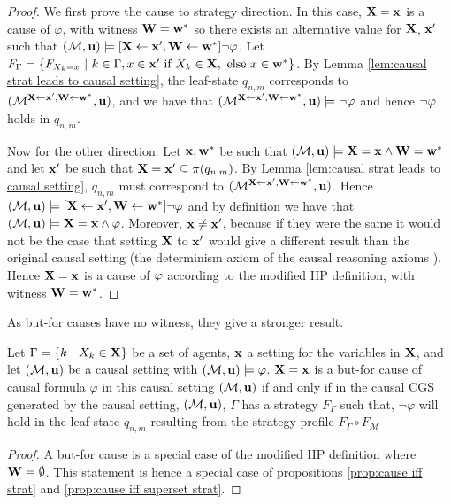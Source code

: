 \begin{proof}
    We first prove the cause to strategy direction.
    In this case, $\mathbf{X} = \mathbf{x}$ is a cause of $\varphi$, with witness $\mathbf{W} = \mathbf{w}^*$ so there exists an alternative value for $\mathbf{X}$, $\mathbf{x}'$ such that $(\mathcal{M},\mathbf{u}) \models [\mathbf{X} \leftarrow \mathbf{x}', \mathbf{W} \leftarrow \mathbf{w}^*] \neg \varphi$.
    Let $F_\Gamma = \{F_{X_k = x} \ | \ k \in \Gamma, x \in \mathbf{x}' \text{ if } X_k \in \mathbf{X}, \text{ else } x \in \mathbf{w}^*\}$. 
    By Lemma \ref{lem:causal strat leads to causal setting}, the leaf-state $q_{n,m}$ corresponds to $(\mathcal{M}^{\mathbf{X} \leftarrow \mathbf{x}',\mathbf{W}\leftarrow \mathbf{w}^*},\mathbf{u})$, and we have that $(\mathcal{M}^{\mathbf{X} \leftarrow \mathbf{x}', \mathbf{W}\leftarrow\mathbf{w}^*},\mathbf{u})\models\neg \varphi$ and hence $\neg \varphi$ holds in $q_{n,m}$.
    
    Now for the other direction. 
    Let $\mathbf{x}, \mathbf{w}^*$ be such that $(\mathcal{M},\mathbf{u}) \models \mathbf{X} = \mathbf{x} \wedge \mathbf{W} = \mathbf{w}^*$ and let $\mathbf{x}'$ be such that $\mathbf{X} = \mathbf{x}'\subseteq \pi(q_{n,m})$. 
    By Lemma \ref{lem:causal strat leads to causal setting}, $q_{n,m}$ must correspond to $(\mathcal{M}^{\mathbf{X}\leftarrow\mathbf{x}', \mathbf{W} \leftarrow \mathbf{w}^*},\mathbf{u})$. 
    Hence $(\mathcal{M},\mathbf{u}) \models [\mathbf{X} \leftarrow \mathbf{x}', \mathbf{W} \leftarrow \mathbf{w}^*]\neg \varphi$ and by definition we have that $(\mathcal{M},\mathbf{u}) \models \mathbf{X} = \mathbf{x} \wedge \varphi$. 
    Moreover, $\mathbf{x} \neq \mathbf{x}'$, because if they were the same it would not be the case that setting $\mathbf{X}$ to $\mathbf{x}'$ would give a different result than the original causal setting (the determinism axiom of the causal reasoning axioms \cite{halpern2016actual}). 
    Hence $\mathbf{X} = \mathbf{x}$ is a cause of $\varphi$ according to the modified HP definition, with witness $\mathbf{W} = \mathbf{w}^*$.
\end{proof}

As but-for causes have no witness, they give a stronger result.

\begin{corollary}\label{col:but-for cause iff strat}
    Let $\Gamma = \{ {k \ | \ X_k \in \mathbf{X}} \}$ be a set of agents, $\mathbf{x}$ a setting for the variables in $\mathbf{X}$, and let $(\mathcal{M},\mathbf{u})$ be a causal setting with $(\mathcal{M},\mathbf{u})\models \varphi$. 
    $\mathbf{X} = \mathbf{x}$ is a but-for cause of causal formula $\varphi$ in this causal setting $(\mathcal{M},\mathbf{u})$ if and only if in the causal CGS generated by the causal setting, $(\mathcal{M},\mathbf{u})$, $\Gamma$ has a strategy $F_\Gamma$ such that, $\neg \varphi$ will hold in the leaf-state $q_{n,m}$ resulting from the strategy profile $F_\Gamma \circ F_\mathcal{M}$
\end{corollary}
\begin{proof}
    A but-for cause is a special case of the modified HP definition where $\mathbf{W} = \emptyset$. This statement is hence a special case of propositions \ref{prop:cause iff strat} and \ref{prop:cause iff superset strat}.
\end{proof}

